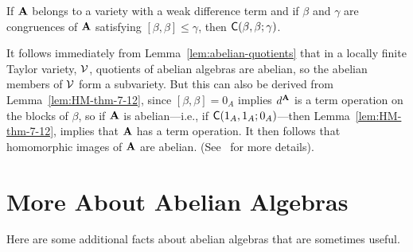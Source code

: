 \begin{lem}
  \label{lem:KK-lem-6-8}
  If $\mathbf{A}$ belongs to a variety with a
  weak difference term and if $\beta$ and $\gamma$ are congruences of $\mathbf{A}$
  satisfying $[\beta, \beta] \leq \gamma$, then $\mathsf{C}(\beta, \beta; \gamma)$.
\end{lem}
\begin{rem}
  \label{rem:abelian-quotients}
  It follows immediately from Lemma~\ref{lem:abelian-quotients} that in a locally
  finite Taylor variety, $\mathcal{V}$, quotients of abelian algebras are abelian, so the
  abelian members of $\mathcal{V}$ form a subvariety.
  But this can also be derived from Lemma~\ref{lem:HM-thm-7-12},
  since $[\beta, \beta] = 0_A$ implies $d^{\mathbf{A}}$ is a \malcev term operation on
  the blocks of $\beta$, so if $\mathbf{A}$ is abelian---i.e., if
  $\mathsf{C}(1_A, 1_A; 0_A)$---then Lemma~\ref{lem:HM-thm-7-12},
  implies that $\mathbf{A}$ has a \malcev term operation.
  It then follows that homomorphic images of $\mathbf{A}$ are
  abelian. (See~\cite[Cor~7.28]{MR2839398} for more details). 
\end{rem}


\newpage

\appendix


\section{More About Abelian Algebras}
\label{sec:abelian-algebras}
Here are some additional facts about abelian algebras that are sometimes useful.

